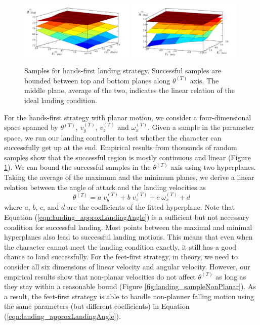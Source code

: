 \begin{figure}[ht]
\center
  \includegraphics[width=0.49\textwidth]{images/sampleVZWX}
  \includegraphics[width=0.49\textwidth]{images/sampleVYVZ}
  \caption{
    Samples for hands-first landing strategy. Successful samples are
    bounded between top and bottom planes along $\theta^{(T)}$
    axis. The middle plane, average of the two, indicates the linear
    relation of the ideal landing condition. 
  }
 \label{fig:landing_samplesPlanar}
\end{figure}
 
For the hands-first strategy with planar motion, we consider a
four-dimensional space spanned by $\theta^{(T)}$, $v_y^{(T)}$,
$v_z^{(T)}$ and $\omega_x^{(T)}$. Given a sample in the parameter
space, we run our landing controller to test whether the character can
successfully get up at the end. Empirical results from thousands of
random samples show that the successful region is mostly continuous
and linear (Figure \ref{fig:landing_samplesPlanar}). We can bound the
successful samples in the $\theta^{(T)}$ axis using two hyperplanes.
Taking the average of the maximum and the minimum planes, we derive a
linear relation between the angle of attack and the landing velocities as
\begin{equation}
\label{eqn:landing_approxLandingAngle}
\theta ^{(T)} = a \;v_y^{(T)} + b \;v_z^{(T)} + c \;\omega_x^{(T)} + d
\end{equation}
where $a$, $b$, $c$, and $d$ are the coefficients of the fitted
hyperplane. Note that Equation (\ref{eqn:landing_approxLandingAngle}) is a
sufficient but not necessary condition for successful landing. Most
points between the maximal and minimal hyperplanes also lead to
successful landing motions. This means that even when the character
cannot meet the landing condition exactly, it still has a good chance
to land successfully. For the feet-first strategy, in theory, we need
to consider all six dimensions of linear velocity and angular
velocity. However, our empirical results show that non-planar
velocities do not affect $\theta^{(T)}$ as long as they stay within a
reasonable bound (Figure \ref{fig:landing_sampleNonPlanar}). As a result, the
feet-first strategy is able to handle non-planner falling motion using
the same parameters (but different coefficients) in Equation
(\ref{eqn:landing_approxLandingAngle}).

